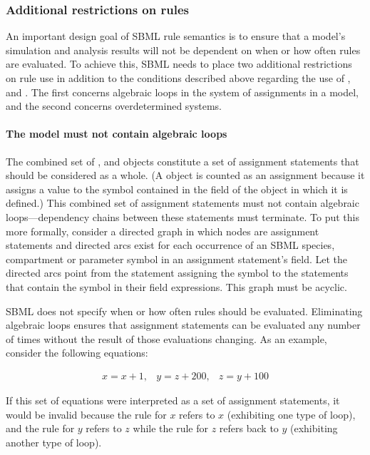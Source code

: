 \subsubsection{Additional restrictions on rules}
\label{sec:ruleconstraints}

An important design goal of SBML rule semantics is to ensure that
a model's simulation and analysis results will not be dependent on
when or how often rules are evaluated.  To achieve this, SBML
needs to place two additional restrictions on rule use in addition
to the conditions described above regarding the use of
\AlgebraicRule, \AssignmentRule and \RateRule.  The first concerns
algebraic loops in the system of assignments in a model, and the
second concerns overdetermined systems.


\paragraph{The model must not contain algebraic loops}

The combined set of \InitialAssignment, \AssignmentRule and
\KineticLaw objects constitute a set of assignment statements that
should be considered as a whole.  (A \KineticLaw object is counted
as an assignment because it assigns a value to the symbol
contained in the  field of the \Reaction object in which
it is defined.)  This combined set of assignment statements must
not contain algebraic loops---dependency chains between these
statements must terminate.  To put this more formally, consider a
directed graph in which nodes are assignment statements and
directed arcs exist for each occurrence of an SBML species,
compartment or parameter symbol in an assignment statement's
 field.  Let the directed arcs point from the
statement assigning the symbol to the statements that contain the
symbol in their  field expressions.  This graph must
be acyclic.

SBML does not specify when or how often rules should be evaluated.
Eliminating algebraic loops ensures that assignment statements can
be evaluated any number of times without the result of those
evaluations changing.  As an example, consider the following
equations:
\begin{linenomath}
\begin{equation*}
  \begin{array}{lll}
    x = x + 1, & y = z + 200, & z = y + 100
  \end{array}
\end{equation*}
\end{linenomath}
If this set of equations were interpreted as a set of assignment
statements, it would be invalid because the rule for $x$ refers to
$x$ (exhibiting one type of loop), and the rule for $y$ refers to
$z$ while the rule for $z$ refers back to $y$ (exhibiting another
type of loop).

